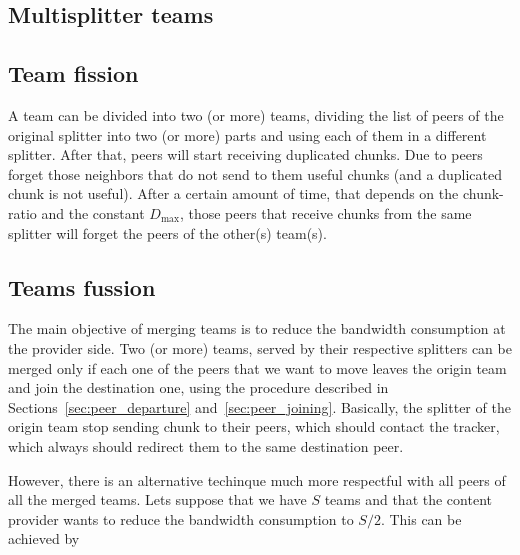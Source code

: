 \subsection{Multisplitter teams}

\subsection{Team fission}
A team can be divided into two (or more) teams, dividing the list of
peers of the original splitter into two (or more) parts and using each
of them in a different splitter. After that, peers will start
receiving duplicated chunks. Due to peers forget those neighbors that
do not send to them useful chunks (and a duplicated chunk is not
useful). After a certain amount of time, that depends on the
chunk-ratio and the constant $D_\text{max}$, those peers that receive
chunks from the same splitter will forget the peers of the other(s)
team(s).

\subsection{Teams fussion}
The main objective of merging teams is to reduce the bandwidth
consumption at the provider side.  Two (or more) teams, served by
their respective splitters can be merged only if each one of the peers
that we want to move leaves the origin team and join the destination
one, using the procedure described in
Sections~\ref{sec:peer_departure}
and~\ref{sec:peer_joining}. Basically, the splitter of the origin team
stop sending chunk to their peers, which should contact the tracker,
which always should redirect them to the same destination peer.

However, there is an alternative techinque much more respectful with
all peers of all the merged teams. Lets suppose that we have $S$ teams
and that the content provider wants to reduce the bandwidth
consumption to $S/2$. This can be achieved by 
